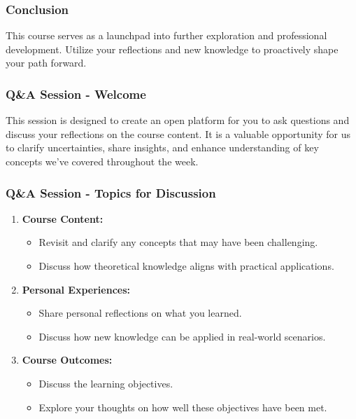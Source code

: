 \documentclass[aspectratio=169]{beamer}
\begin{document}
\begin{frame}[fragile]
    \frametitle{Conclusion}
    This course serves as a launchpad into further exploration and professional development. Utilize your reflections and new knowledge to proactively shape your path forward.
\end{frame}

\begin{frame}[fragile]
    \frametitle{Q\&A Session - Welcome}
    This session is designed to create an open platform for you to ask questions 
    and discuss your reflections on the course content. It is a valuable opportunity 
    for us to clarify uncertainties, share insights, and enhance understanding of 
    key concepts we've covered throughout the week.
\end{frame}

\begin{frame}[fragile]
    \frametitle{Q\&A Session - Topics for Discussion}
    \begin{enumerate}
        \item \textbf{Course Content:}
        \begin{itemize}
            \item Revisit and clarify any concepts that may have been challenging.
            \item Discuss how theoretical knowledge aligns with practical applications.
        \end{itemize}
        
        \item \textbf{Personal Experiences:}
        \begin{itemize}
            \item Share personal reflections on what you learned.
            \item Discuss how new knowledge can be applied in real-world scenarios.
        \end{itemize}
        
        \item \textbf{Course Outcomes:}
        \begin{itemize}
            \item Discuss the learning objectives.
            \item Explore your thoughts on how well these objectives have been met.
        \end{itemize}
    \end{enumerate}
\end{frame}
\end{document}
